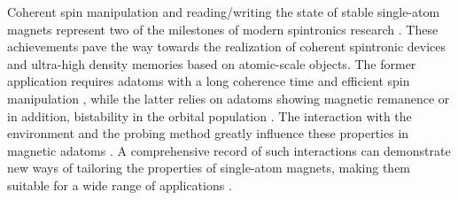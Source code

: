 \documentclass[
reprint,amsmath,amssymb,aps]{revtex4-2}
\begin{document}
\maketitle



Coherent spin manipulation and reading/writing the state of stable single-atom magnets represent two of the milestones of modern spintronics research \cite{Natterer2017,yang2019}. These achievements pave the way towards the realization of coherent spintronic devices and ultra-high density memories based on atomic-scale objects. The former application requires adatoms with a long coherence time and efficient spin manipulation \cite{baumannElectronParamagneticResonance2015,yang2019}, while the latter relies on adatoms showing magnetic remanence \cite{baltic2018,donatiMagneticRemanenceSingle2016,Natterer2018} or in addition, bistability in the orbital population \cite{kiralyOrbitallyDerivedSingleatom2018}. The interaction with the environment and the probing method greatly influence these properties in magnetic adatoms \cite{malavolti_MinimallyInvasiveSpin_2020,verlhacAtomicscaleSpinSensing2019a}. A comprehensive record of such interactions can demonstrate new ways of tailoring the properties of single-atom magnets, making them suitable for a wide range of applications \cite{kiraly_AtomicBoltzmannMachine_2021,khajetooriansRealizingAllSpinBased2011}.
\end{document}
